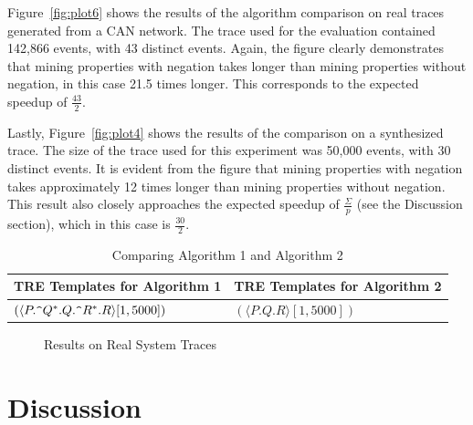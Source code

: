 \documentclass[]{sigplanconf}
\begin{document}
Figure~\ref{fig:plot6} shows the results of the algorithm comparison on real traces generated from a CAN network. The trace used for the evaluation contained 142,866 events, with 43 distinct events. Again, the figure clearly demonstrates that mining properties with negation takes longer than mining properties without negation, in this case 21.5 times longer. This corresponds to the expected speedup of $\frac{43}{2}$.

Lastly, Figure~\ref{fig:plot4} shows the results of the comparison on a synthesized trace. The size of the trace used for this experiment was 50,000 events, with 30 distinct events. It is evident from the figure that mining properties with negation takes approximately 12 times longer than mining properties without negation. This result also closely approaches the expected speedup of $\frac{\Sigma}{p}$ (see the Discussion section), which in this case is $\frac{30}{2}$.



\begin{table}[!ht]
	\centering
	\begin{tabular}{|l|l|}
		\hline
		\textbf{TRE Templates for Algorithm 1} & \textbf{TRE Templates for Algorithm 2} \\
		\hline
		 $(\langle P.\verb!^!Q^*.Q.\verb!^!R^*.R \rangle [1, 5000])$& $(\langle P.Q.R \rangle [1, 5000])$ \\
	\end{tabular}

	\caption{Comparing Algorithm 1 and Algorithm 2}
	\label{miningOverhead}
\end{table}


\begin{figure}[!ht]
  \centering
  \caption{Results on Real System Traces}\label{Algs_real}
\end{figure}

\section{Discussion} \label{discussion}
\end{document}
